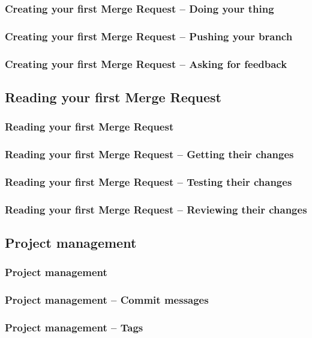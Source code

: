 \documentclass{beamer}
\begin{document}
\begin{frame}[fragile]
  \frametitle{Creating your first Merge Request -- Doing your thing}
\end{frame}

\begin{frame}[fragile]
  \frametitle{Creating your first Merge Request -- Pushing your branch}
\end{frame}

\begin{frame}[fragile]
  \frametitle{Creating your first Merge Request -- Asking for feedback}
\end{frame}

\subsection{Reading your first Merge Request}

\begin{frame}[fragile]
  \frametitle{Reading your first Merge Request}
\end{frame}

\begin{frame}[fragile]
  \frametitle{Reading your first Merge Request -- Getting their changes}
\end{frame}

\begin{frame}[fragile]
  \frametitle{Reading your first Merge Request -- Testing their changes}
\end{frame}

\begin{frame}[fragile]
  \frametitle{Reading your first Merge Request -- Reviewing their changes}  %
\end{frame}

\subsection{Project management}

\begin{frame}[fragile]
  \frametitle{Project management}
\end{frame}

\begin{frame}[fragile]
  \frametitle{Project management -- Commit messages}
\end{frame}

\begin{frame}[fragile]
  \frametitle{Project management -- Tags}
\end{frame}
\end{document}
